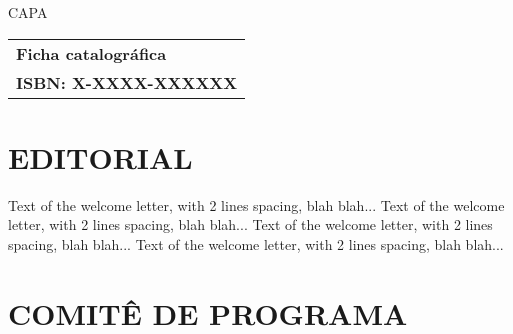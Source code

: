 \documentclass[a4paper,12pt,twoside,onesidepapers,%
  electronic,%
  papers=final,%
  headers=allpages,%
	onecoltoc,
	tocnum=right,
	twocolindex,
	movepagenumber=true,%
hyperref={bookmarksdepth=1,bookmarksopen,bookmarksopenlevel=0,%
 linkcolor=black,urlcolor=blue}, %
  geometry={text={175truemm,226truemm},%
    inner=0.69in,top=25mm,bottom=28mm,footskip=10.4mm,voffset=0mm},%
]{confproc}
\author{\procpdfauthor}
\title{\procpdftitle}
\begin{document}
\frontmatter
\setcounter{page}{1}

CAPA
\newpage

\vspace*{\fill}
\thispagestyle{empty}
\noindent \begin{tabular}{|p{\linewidth}|}
	\hline
	\textbf{Ficha catalográfica} \\
	{\bf ISBN: X-XXXX-XXXXXX}\\
	\hline
\end{tabular}

\newpage


\vspace*{\fill}

\section*{\centering \normalfont \LARGE EDITORIAL}
\vspace*{0.6in}
\doublespace

\begin{center}
	\begin{minipage}[h]{14cm}
		Text of the welcome letter, with 2 lines spacing, blah blah...
		Text of the welcome letter, with 2 lines spacing, blah blah...
		Text of the welcome letter, with 2 lines spacing, blah blah...
		Text of the welcome letter, with 2 lines spacing, blah blah...
	\end{minipage}
\end{center}

\vspace*{\fill}

\singlespace
\newpage


\vspace*{\fill}

\section*{\centering \normalfont \LARGE COMITÊ DE PROGRAMA}
\vspace{0.6in}
\doublespace
\end{document}
